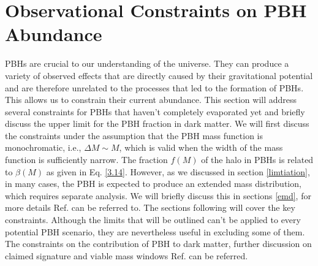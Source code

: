 \chapter{Observational Constraints on PBH Abundance }


PBHs are crucial to our understanding of the universe.
They can produce a variety of observed effects that are directly caused by their gravitational potential and are therefore unrelated to the processes that led to the formation of PBHs. This allows us to constrain their current abundance. This section will address several constraints for PBHs that haven't completely evaporated yet and briefly discuss the upper limit for the PBH fraction in dark matter.
We will first discuss the constraints under the assumption that the PBH mass function is monochromatic, i.e., $\Delta M \sim M$, which is valid when the width of the mass function is sufficiently narrow. The fraction $f(M)$ of the halo in PBHs is related to $\beta(M)$ as given in Eq. \ref{3.14}. However, as we discussed in section \ref{limtiation}, in many cases, the PBH is expected to produce an extended mass distribution, which requires separate analysis. We will briefly discuss this in sections \ref{emd}, for more  details Ref. \cite{Carr:2016drx, Carr:2017jsz, Green:2016xgy, Bellomo:2017zsr} can be referred to. The sections following will cover the key constraints. Although the limits that will be outlined can't be applied to every potential PBH scenario, they are nevertheless useful in excluding some of them. The constraints on the contribution of PBH to dark matter, further discussion on claimed signature and viable mass windows Ref.\cite{Sasaki_2018, Carr:2019kxo, Carr:2020xqk} can be referred.\\

